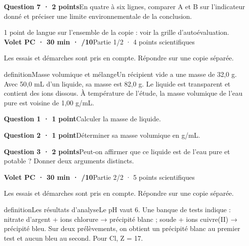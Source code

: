 \par\addvspace{3mm}\noindent\textbf{Question 7 · 2 points}\quad En quatre à six lignes, comparer A et B sur l’indicateur donné et préciser une limite environnementale de la conclusion.\par
\vfill{}
{\small 1 point de langue sur l’ensemble de la copie : voir la grille d’autoévaluation.}
\label{bb-2}
\noindent\textbf{Volet PC · 30 min · /10}\hfill Partie 1/2 · 4 points scientifiques
\par\vspace{2mm}Les essais et démarches sont pris en compte. Répondre sur une copie séparée.\par
\begin{pcEncadre}{definition}{Masse volumique et mélange}Un récipient vide a une masse de 32,0 g. Avec 50,0 mL d’un liquide, sa masse est 82,0 g. Le liquide est transparent et contient des ions dissous. À température de l’étude, la masse volumique de l’eau pure est voisine de 1,00 g/mL.\end{pcEncadre}
\par\addvspace{3mm}\noindent\textbf{Question 1 · 1 point}\quad Calculer la masse de liquide.\par
\par\addvspace{3mm}\noindent\textbf{Question 2 · 1 point}\quad Déterminer sa masse volumique en g/mL.\par
\par\addvspace{3mm}\noindent\textbf{Question 3 · 2 points}\quad Peut-on affirmer que ce liquide est de l’eau pure et potable ? Donner deux arguments distincts.\par
\vfill{}
\noindent\textbf{Volet PC · 30 min · /10}\hfill Partie 2/2 · 5 points scientifiques
\par\vspace{2mm}Les essais et démarches sont pris en compte. Répondre sur une copie séparée.\par
\begin{pcEncadre}{definition}{Les résultats d’analyse}Le pH vaut 6. Une banque de tests indique : nitrate d’argent + ions chlorure → précipité blanc ; soude + ions cuivre(II) → précipité bleu. Sur deux prélèvements, on obtient un précipité blanc au premier test et aucun bleu au second. Pour Cl, Z = 17.\end{pcEncadre}
